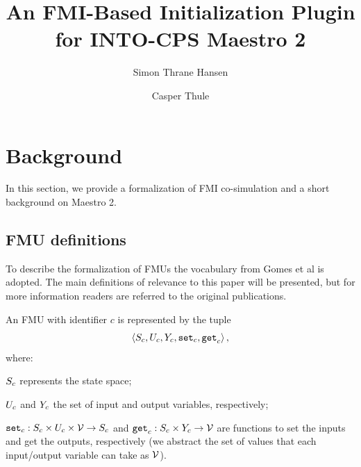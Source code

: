 \documentclass[runningheads]{llncs}
\begin{document}
%
\title{An FMI-Based Initialization Plugin for INTO-CPS Maestro 2}
%
%
\author{Simon Thrane Hansen \and
Casper Thule}
%
%
%
\maketitle              %
%






\section{Background}\label{sc:background}
In this section, we provide a formalization of FMI co-simulation and a short background on Maestro 2.

\subsection{FMU definitions}
To describe the formalization of FMUs the vocabulary from Gomes et al\cite{gomes_lucio_vangheluwe_2019, Gomes2018} is adopted. The main definitions of relevance to this paper will be presented, but for more information readers are referred to the original publications. 
\begin{definition}[FMU]\label{def:fmu}
  An FMU with identifier $c$ is represented by the tuple   
  $$ \left\langle S_{c}, U_{c}, Y_{c}, \mathtt{set}_{c}, \mathtt{get}_{c} \right\rangle ,$$
  where:
  \begin{inparadesc}
    \item $S_{c}$ represents the state space;
    \item $U_{c}$ and $Y_{c}$ the set of input and output variables, respectively;
    \item $\mathtt{set}_{c} : S_{c} \times U_{c} \times \mathcal{V} \to S_{c}$ and $\mathtt{get}_{c}: S_{c} \times Y_{c} \to \mathcal{V}$ are functions to set the inputs and get the outputs, respectively (we abstract the set of values that each input/output variable can take as $\mathcal{V}$).
  \end{inparadesc}
\end{definition}
\end{document}
